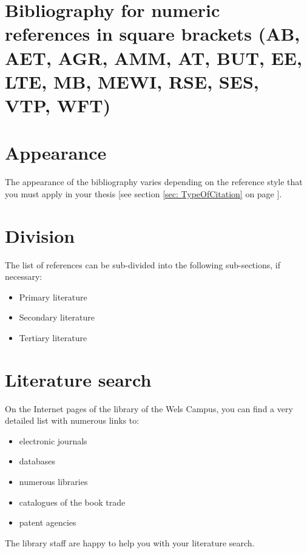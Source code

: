 \section{Bibliography for numeric references in square brackets (AB, AET, AGR, AMM, AT, BUT, EE, LTE, MB, MEWI, RSE, SES, VTP, WFT)}
\printbibliography[heading=none]

\vspace{1mm}

\newpage
\section*{Appearance}
The appearance of the bibliography varies depending on the reference style that you must apply in your thesis [see section \ref{sec: TypeOfCitation} on page \pageref{sec: TypeOfCitation}].

\section*{Division}
The list of references can be sub-divided into the following sub-sections, if necessary:
\begin{itemize}
	\item	Primary literature 
	\item	Secondary literature
	\item	Tertiary literature
\end{itemize}

\section*{Literature search}
On the Internet pages of the library of the Wels Campus, you can find a very detailed list with numerous links to:
\begin{itemize}
	\item	electronic journals
	\item	databases
	\item	numerous libraries
	\item	catalogues of the book trade
	\item	patent agencies

\end{itemize}
The library staff are happy to help you with your literature search.


